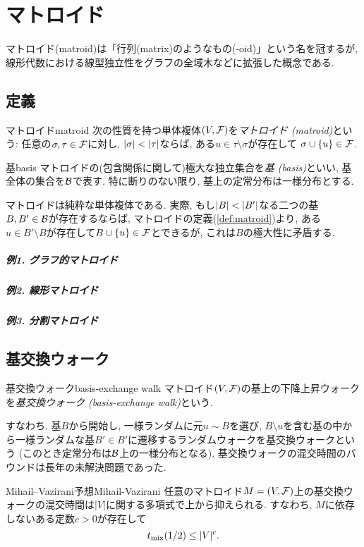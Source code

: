 \chapter{マトロイド} \label{chap:matroid}
マトロイド(matroid)は「行列(matrix)のようなもの(-oid)」という名を冠するが,
線形代数における線型独立性をグラフの全域木などに拡張した概念である.

\section{定義}
\begin{definition}{マトロイド}{matroid}
    次の性質を持つ単体複体$(V,\mathcal{F})$を\emph{マトロイド (matroid)}という:
    任意の$\sigma,\tau \in \mathcal{F}$に対し, $\lvert\sigma\rvert < \lvert\tau\rvert$ならば,
    ある$ u \in \tau \setminus \sigma$が存在して
    $\sigma \cup \lbrace u\rbrace \in \mathcal{F}$.
\end{definition}

\begin{definition}{基}{basis}
    マトロイドの(包含関係に関して)極大な独立集合を\emph{基 (basis)}といい, 基全体の集合を$\mathcal{B}$で表す.
    特に断りのない限り, 基上の定常分布は一様分布とする.
\end{definition}
マトロイドは純粋な単体複体である.
実際, もし$\lvert B\rvert < \lvert B'\rvert$なる二つの基$B,B'\in\mathcal{B}$が存在するならば,
マトロイドの定義(\cref{def:matroid})より,
ある$u \in B'\setminus B$が存在して$B\cup \{u\} \in \mathcal{F}$とできるが,
これは$B$の極大性に矛盾する.

\paragraph*{例1. グラフ的マトロイド}
\paragraph*{例2. 線形マトロイド}
\paragraph*{例3. 分割マトロイド}

\section{基交換ウォーク}
\begin{definition}{基交換ウォーク}{basis-exchange walk}
    マトロイド$(V,\mathcal{F})$の基上の下降上昇ウォークを\emph{基交換ウォーク (basis-exchange walk)}という.
\end{definition}
すなわち, 基$B$から開始し,
一様ランダムに元$u\sim B$を選び,
$B\setminus u$を含む基の中から一様ランダムな基$B'\in B'$に遷移するランダムウォークを基交換ウォークという (このとき定常分布は$\mathcal{B}$上の一様分布となる).
基交換ウォークの混交時間のバウンドは長年の未解決問題であった.
\begin{conjecture}{Mihail--Vazirani予想}{Mihail-Vazirani}
    任意のマトロイド$M=(V,\mathcal{F})$上の基交換ウォークの混交時間は$|V|$に関する多項式で上から抑えられる.
    すなわち, $M$に依存しないある定数$c>0$が存在して
    \[
        t_{\mathrm{mix}}(1/2) \le |V|^c.
    \]
\end{conjecture}

